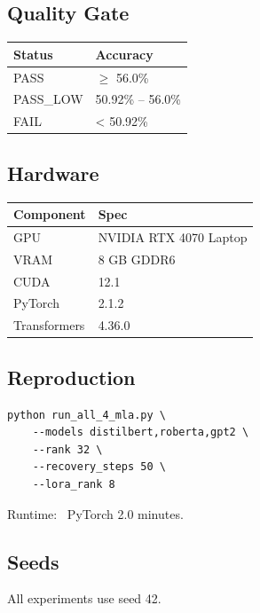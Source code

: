 \subsection{Quality Gate}

\begin{table}[H]
\centering
\small
\begin{tabular}{ll}
\toprule
\textbf{Status} & \textbf{Accuracy} \\
\midrule
PASS & $\ge$ 56.0\% \\
PASS\_LOW & 50.92\% -- 56.0\% \\
FAIL & < 50.92\% \\
\bottomrule
\end{tabular}
\end{table}

\subsection{Hardware}

\begin{table}[H]
\centering
\small
\begin{tabular}{ll}
\toprule
\textbf{Component} & \textbf{Spec} \\
\midrule
GPU & NVIDIA RTX 4070 Laptop \\
VRAM & 8 GB GDDR6 \\
CUDA & 12.1 \\
PyTorch & 2.1.2 \\
Transformers & 4.36.0 \\
\bottomrule
\end{tabular}
\end{table}

\subsection{Reproduction}

\begin{lstlisting}
python run_all_4_mla.py \
    --models distilbert,roberta,gpt2 \
    --rank 32 \
    --recovery_steps 50 \
    --lora_rank 8
\end{lstlisting}

Runtime: ~PyTorch 2.0 minutes.

\subsection{Seeds}

All experiments use seed 42.

